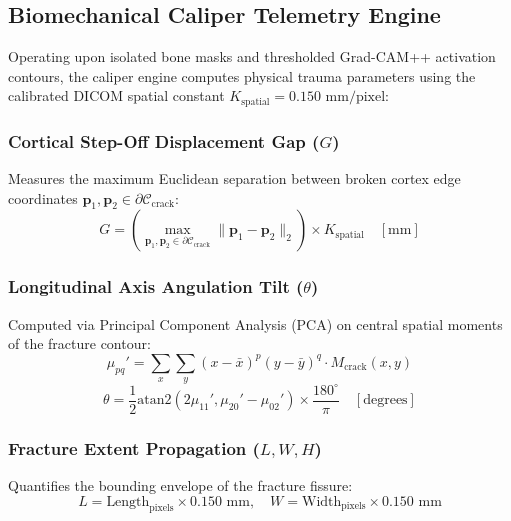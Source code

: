 \documentclass[journal]{IEEEtran}
\begin{document}
\subsection{Biomechanical Caliper Telemetry Engine}
Operating upon isolated bone masks and thresholded Grad-CAM++ activation contours, the caliper engine computes physical trauma parameters using the calibrated DICOM spatial constant $K_{\text{spatial}} = 0.150\text{ mm/pixel}$:

\subsubsection{Cortical Step-Off Displacement Gap ($G$)}
Measures the maximum Euclidean separation between broken cortex edge coordinates $\mathbf{p}_1, \mathbf{p}_2 \in \partial \mathcal{C}_{\text{crack}}$:
\begin{equation}
    G = \left(\max_{\mathbf{p}_1, \mathbf{p}_2 \in \partial \mathcal{C}_{\text{crack}}} \|\mathbf{p}_1 - \mathbf{p}_2\|_2\right) \times K_{\text{spatial}} \quad [\text{mm}]
\end{equation}

\subsubsection{Longitudinal Axis Angulation Tilt ($\theta$)}
Computed via Principal Component Analysis (PCA) on central spatial moments of the fracture contour:
\begin{equation}
    \mu_{pq}' = \sum_{x}\sum_{y} (x - \bar{x})^p (y - \bar{y})^q \cdot M_{\text{crack}}(x, y)
\end{equation}
\begin{equation}
    \theta = \frac{1}{2} \text{atan2}\left(2\mu_{11}', \mu_{20}' - \mu_{02}'\right) \times \frac{180^\circ}{\pi} \quad [\text{degrees}]
\end{equation}

\subsubsection{Fracture Extent Propagation ($L, W, H$)}
Quantifies the bounding envelope of the fracture fissure:
\begin{equation}
    L = \text{Length}_{\text{pixels}} \times 0.150\text{ mm}, \quad W = \text{Width}_{\text{pixels}} \times 0.150\text{ mm}
\end{equation}

\end{document}
